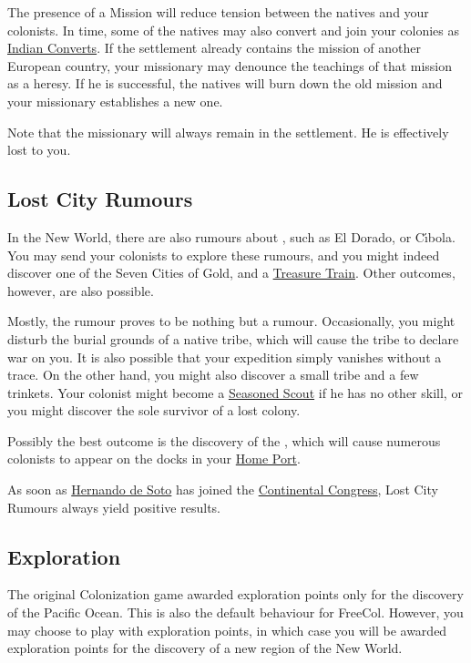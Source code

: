 \documentclass[12pt]{article}
\begin{document}
The presence of a Mission will reduce tension between the natives and
your colonists. In time, some of the natives may also convert and join
your colonies as \hyperlink{Indian Convert}{Indian Converts}. If the
settlement already contains the mission of another European country,
your missionary may denounce the teachings of that mission as a
heresy. If he is successful, the natives will burn down the old
mission and your missionary establishes a new one.

Note that the missionary will always remain in the settlement. He is
effectively lost to you.


\hypertarget{Lost City Rumours}{\subsection{Lost City Rumours}}

In the New World, there are also rumours about ,
such as El Dorado, or C{\'\i}bola. You may send your colonists to
explore these rumours, and you might indeed discover one of the Seven
Cities of Gold, and a \hyperlink{Treasure Train}{Treasure Train}.
Other outcomes, however, are also possible.

Mostly, the rumour proves to be nothing but a rumour. Occasionally,
you might disturb the burial grounds of a native tribe, which will
cause the tribe to declare war on you. It is also possible that your
expedition simply vanishes without a trace. On the other hand, you
might also discover a small tribe and a few trinkets. Your colonist
might become a \hyperlink{Seasoned Scout}{Seasoned Scout} if he has no
other skill, or you might discover the sole survivor of a lost
colony.

Possibly the best outcome is the discovery of the , which will cause numerous colonists to appear on the docks in
your \hyperlink{Home Port}{Home Port}.

As soon as \hyperlink{Hernando de Soto}{Hernando de Soto} has joined
the \hyperlink{Continental Congress}{Continental Congress}, Lost City
Rumours always yield positive results.


\hypertarget{Exploration}{\subsection{Exploration}}

The original Colonization game awarded exploration points only for the
discovery of the Pacific Ocean. This is also the default behaviour for
FreeCol. However, you may choose to play with exploration points, in
which case you will be awarded exploration points for the discovery of
a new region of the New World.
\end{document}

